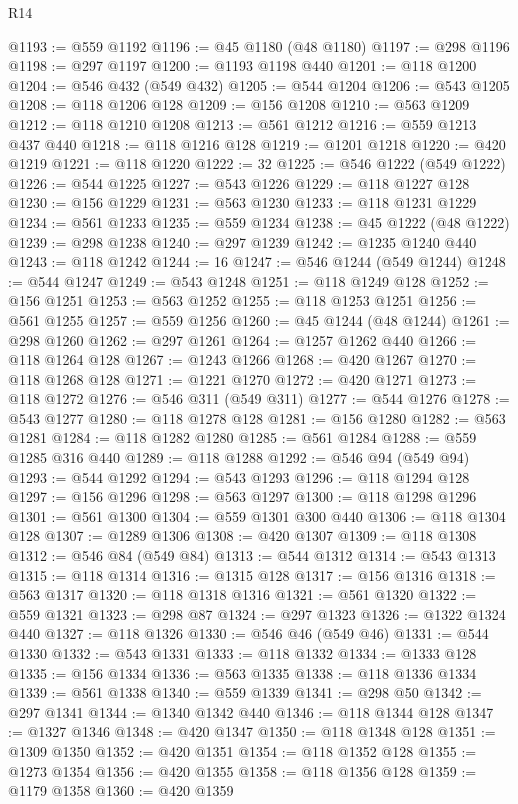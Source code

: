\begin{lexlean}{R14}
\begin{coremodule}
{{{{{{{{{{{{{{{{{{{{{{{{{{{{{{{{{{{{{{{{{{{{{{{{{{{{{{{{{{{{{{{{{{{{{{{{{{{{{{{{{{@1193 := @559 @1192
@1196 := @45 @1180 (@48 @1180)
@1197 := @298 @1196
@1198 := @297 @1197
@1200 := @1193 @1198 @440
@1201 := @118 @1200
@1204 := @546 @432 (@549 @432)
@1205 := @544 @1204
@1206 := @543 @1205
@1208 := @118 @1206 @128
@1209 := @156 @1208
@1210 := @563 @1209
@1212 := @118 @1210 @1208
@1213 := @561 @1212
@1216 := @559 @1213 @437 @440
@1218 := @118 @1216 @128
@1219 := @1201 @1218
@1220 := @420 @1219
@1221 := @118 @1220
@1222 := 32
@1225 := @546 @1222 (@549 @1222)
@1226 := @544 @1225
@1227 := @543 @1226
@1229 := @118 @1227 @128
@1230 := @156 @1229
@1231 := @563 @1230
@1233 := @118 @1231 @1229
@1234 := @561 @1233
@1235 := @559 @1234
@1238 := @45 @1222 (@48 @1222)
@1239 := @298 @1238
@1240 := @297 @1239
@1242 := @1235 @1240 @440
@1243 := @118 @1242
@1244 := 16
@1247 := @546 @1244 (@549 @1244)
@1248 := @544 @1247
@1249 := @543 @1248
@1251 := @118 @1249 @128
@1252 := @156 @1251
@1253 := @563 @1252
@1255 := @118 @1253 @1251
@1256 := @561 @1255
@1257 := @559 @1256
@1260 := @45 @1244 (@48 @1244)
@1261 := @298 @1260
@1262 := @297 @1261
@1264 := @1257 @1262 @440
@1266 := @118 @1264 @128
@1267 := @1243 @1266
@1268 := @420 @1267
@1270 := @118 @1268 @128
@1271 := @1221 @1270
@1272 := @420 @1271
@1273 := @118 @1272
@1276 := @546 @311 (@549 @311)
@1277 := @544 @1276
@1278 := @543 @1277
@1280 := @118 @1278 @128
@1281 := @156 @1280
@1282 := @563 @1281
@1284 := @118 @1282 @1280
@1285 := @561 @1284
@1288 := @559 @1285 @316 @440
@1289 := @118 @1288
@1292 := @546 @94 (@549 @94)
@1293 := @544 @1292
@1294 := @543 @1293
@1296 := @118 @1294 @128
@1297 := @156 @1296
@1298 := @563 @1297
@1300 := @118 @1298 @1296
@1301 := @561 @1300
@1304 := @559 @1301 @300 @440
@1306 := @118 @1304 @128
@1307 := @1289 @1306
@1308 := @420 @1307
@1309 := @118 @1308
@1312 := @546 @84 (@549 @84)
@1313 := @544 @1312
@1314 := @543 @1313
@1315 := @118 @1314
@1316 := @1315 @128
@1317 := @156 @1316
@1318 := @563 @1317
@1320 := @118 @1318 @1316
@1321 := @561 @1320
@1322 := @559 @1321
@1323 := @298 @87
@1324 := @297 @1323
@1326 := @1322 @1324 @440
@1327 := @118 @1326
@1330 := @546 @46 (@549 @46)
@1331 := @544 @1330
@1332 := @543 @1331
@1333 := @118 @1332
@1334 := @1333 @128
@1335 := @156 @1334
@1336 := @563 @1335
@1338 := @118 @1336 @1334
@1339 := @561 @1338
@1340 := @559 @1339
@1341 := @298 @50
@1342 := @297 @1341
@1344 := @1340 @1342 @440
@1346 := @118 @1344 @128
@1347 := @1327 @1346
@1348 := @420 @1347
@1350 := @118 @1348 @128
@1351 := @1309 @1350
@1352 := @420 @1351
@1354 := @118 @1352 @128
@1355 := @1273 @1354
@1356 := @420 @1355
@1358 := @118 @1356 @128
@1359 := @1179 @1358
@1360 := @420 @1359
}}}}}}}}}}}}}}}}}}}}}}}}}}}}}}}}}}}}}}}}}}}}}}}}}}}}}}}}}}}}}}}}}}}}}}}}}}}}}}}}}}
\end{coremodule}
\end{lexlean}
